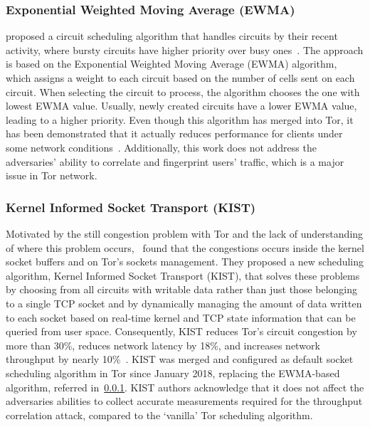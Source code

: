 \subsubsection{Exponential Weighted Moving Average (EWMA)}\label{subsubsec:exponentialwma}

\citeauthor{EWMA} proposed a circuit scheduling algorithm that handles circuits by their recent activity, where bursty circuits have higher priority over busy ones~\cite{EWMA}.
The approach is based on the Exponential Weighted Moving Average (EWMA) algorithm, which assigns a weight to each circuit based on the number of cells sent on each circuit. When selecting the circuit to process, the algorithm chooses the one with lowest EWMA value. Usually, newly created circuits have a lower EWMA value, leading to a higher priority. 
Even though this algorithm has merged into Tor, it has been demonstrated that it actually reduces performance for clients under some network conditions~\cite{shadow-ndss2012}. Additionally, this work does not address the adversaries' ability to correlate and fingerprint users' traffic, which is a major issue in Tor network.

\subsubsection{Kernel Informed Socket Transport (KIST)}\label{subsubsec:kist}

Motivated by the still congestion problem with Tor and the lack of understanding of where this problem occurs,~\citeauthor{KIST} found that the congestions occurs inside the kernel socket buffers and on Tor's sockets management. They proposed a new scheduling algorithm, Kernel Informed Socket Transport (KIST), that solves these problems by choosing from all circuits with writable data rather than just those belonging to a single TCP socket and by dynamically managing the amount of data written to each socket based on real-time kernel and TCP state information that can be queried from user space. Consequently, KIST reduces Tor's circuit congestion by more than 30\%, reduces network latency by 18\%, and increases network throughput by nearly 10\%~\cite{KIST}. 
KIST was merged and configured as default socket scheduling algorithm in Tor since January 2018, replacing the EWMA-based algorithm, referred in~\cref{subsubsec:exponentialwma}. KIST authors acknowledge that it does not affect the adversaries abilities to collect accurate measurements required for the throughput correlation attack, compared to the `vanilla' Tor scheduling algorithm.

